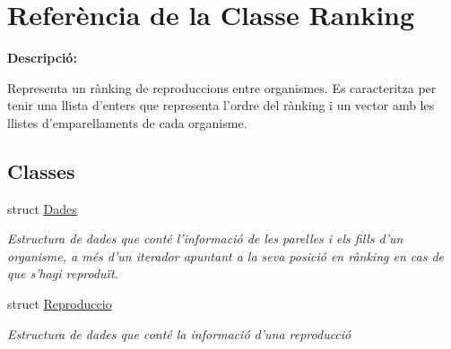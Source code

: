 \hypertarget{class_ranking}{\section{Referència de la Classe Ranking}
\label{class_ranking}
}


{\bfseries Descripció\-:}\par
 Representa un rànking de reproduccions entre organismes. Es caracteritza per tenir una llista d'enters que representa l'ordre del rànking i un vector amb les llistes d'emparellaments de cada organisme.  


\subsection*{Classes}
\begin{DoxyCompactItemize}
\item 
struct \hyperlink{struct_ranking_1_1_dades}{Dades}
\begin{DoxyCompactList}\small\item\em Estructura de dades que conté l'informació de les parelles i els fills d'un organisme, a més d'un iterador apuntant a la seva posició en rànking en cas de que s'hagi reproduït. \end{DoxyCompactList}\item 
struct \hyperlink{struct_ranking_1_1_reproduccio}{Reproduccio}
\begin{DoxyCompactList}\small\item\em Estructura de dades que conté la informació d'una reproducció \end{DoxyCompactList}\end{DoxyCompactItemize}

